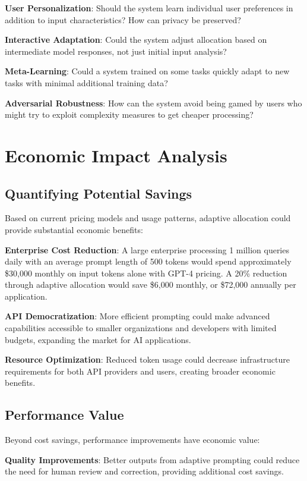 \documentclass[11pt,a4paper]{article}
\begin{document}
\textbf{User Personalization}: Should the system learn individual user preferences in addition to input characteristics? How can privacy be preserved?

\textbf{Interactive Adaptation}: Could the system adjust allocation based on intermediate model responses, not just initial input analysis?

\textbf{Meta-Learning}: Could a system trained on some tasks quickly adapt to new tasks with minimal additional training data?

\textbf{Adversarial Robustness}: How can the system avoid being gamed by users who might try to exploit complexity measures to get cheaper processing?

\section{Economic Impact Analysis}

\subsection{Quantifying Potential Savings}

Based on current pricing models and usage patterns, adaptive allocation could provide substantial economic benefits:

\textbf{Enterprise Cost Reduction}: A large enterprise processing 1 million queries daily with an average prompt length of 500 tokens would spend approximately \$30,000 monthly on input tokens alone with GPT-4 pricing. A 20\% reduction through adaptive allocation would save \$6,000 monthly, or \$72,000 annually per application.

\textbf{API Democratization}: More efficient prompting could make advanced capabilities accessible to smaller organizations and developers with limited budgets, expanding the market for AI applications.

\textbf{Resource Optimization}: Reduced token usage could decrease infrastructure requirements for both API providers and users, creating broader economic benefits.

\subsection{Performance Value}

Beyond cost savings, performance improvements have economic value:

\textbf{Quality Improvements}: Better outputs from adaptive prompting could reduce the need for human review and correction, providing additional cost savings.
\end{document}
